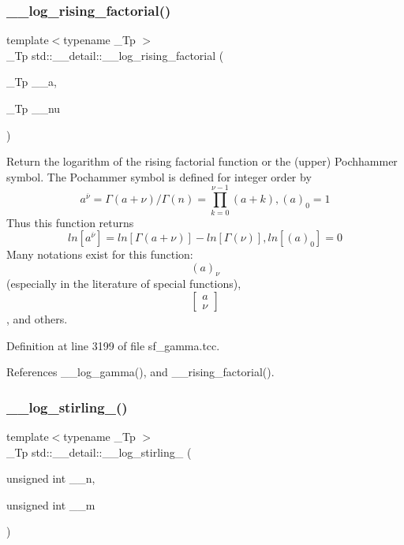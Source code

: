 \subsubsection{\texorpdfstring{\+\_\+\+\_\+log\+\_\+rising\+\_\+factorial()}{\_\_log\_rising\_factorial()}}
{\footnotesize\ttfamily template$<$typename \+\_\+\+Tp $>$ \\
\+\_\+\+Tp std\+::\+\_\+\+\_\+detail\+::\+\_\+\+\_\+log\+\_\+rising\+\_\+factorial (\begin{DoxyParamCaption}\item[{\+\_\+\+Tp}]{\+\_\+\+\_\+a,  }\item[{\+\_\+\+Tp}]{\+\_\+\+\_\+nu }\end{DoxyParamCaption})}



Return the logarithm of the rising factorial function or the (upper) Pochhammer symbol. The Pochammer symbol is defined for integer order by \[ a^{\overline{\nu}} = \Gamma(a + \nu) / \Gamma(n) = \prod_{k=0}^{\nu-1} (a + k), (a)_0 = 1 \] Thus this function returns \[ ln[a^{\overline{\nu}}] = ln[\Gamma(a + \nu)] - ln[\Gamma(\nu)], ln[(a)_0] = 0 \] Many notations exist for this function\+: \[ (a)_\nu \] (especially in the literature of special functions), \[ \left[ \begin{array}{c} a \\ \nu \end{array} \right] \], and others. 



Definition at line 3199 of file sf\+\_\+gamma.\+tcc.



References \+\_\+\+\_\+log\+\_\+gamma(), and \+\_\+\+\_\+rising\+\_\+factorial().

\mbox{\label{namespacestd_1_1____detail_a4924c5c0666c33328d6276b5dbbdfad5}} 
\subsubsection{\texorpdfstring{\+\_\+\+\_\+log\+\_\+stirling\+\_()}{\_\_log\_stirling\_1()}}
{\footnotesize\ttfamily template$<$typename \+\_\+\+Tp $>$ \\
\+\_\+\+Tp std\+::\+\_\+\+\_\+detail\+::\+\_\+\+\_\+log\+\_\+stirling\+\_ (\begin{DoxyParamCaption}\item[{unsigned int}]{\+\_\+\+\_\+n,  }\item[{unsigned int}]{\+\_\+\+\_\+m }\end{DoxyParamCaption})}

